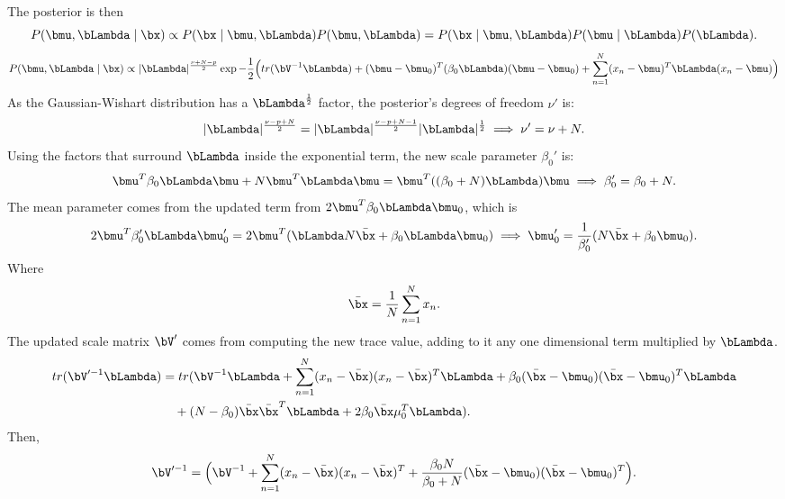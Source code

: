The posterior is then
\[
  P(\bmu, \bLambda \mid \bx) \propto P(\bx \mid \bmu, \bLambda)P(\bmu, \bLambda) = P(\bx \mid \bmu, \bLambda)P(\bmu \mid \bLambda) P(\bLambda).
\]
\[
  P(\bmu, \bLambda \mid \bx) \propto |\bLambda|^{\frac{\nu + N - p}{2}} \exp -\frac{1}{2}\Big( tr(\bV^{-1}\bLambda) + (\bmu - \bmu_{0})^{T} (\beta_{0}\bLambda)(\bmu - \bmu_{0}) + \sum_{n=1}^{N}(x_{n} - \bmu)^{T}\bLambda(x_{n}- \bmu)  \Big)
\]
As the Gaussian-Wishart distribution has a \(\bLambda^{\frac{1}{2}}\) factor, the posterior's degrees of freedom \(\nu'\) is:
\[
  |\bLambda|^{\frac{\nu - p + N}{2}} = |\bLambda|^{\frac{\nu - p + N-1}{2}} |\bLambda|^{\frac{1}{2}}  \implies \nu' = \nu + N.
\]
Using the factors that surround \(\bLambda\) inside the exponential term, the new scale parameter \(\beta_{0}'\) is:
\[
  \bmu^{T}\beta_{0}\bLambda\bmu + N\bmu^{T}\bLambda\bmu = \bmu^{T}((\beta_{0} + N)\bLambda)\bmu \implies \beta_{0}' = \beta_{0} + N.
\]
The mean parameter comes from the updated term from \(2\bmu^{T}\beta_{0}\bLambda\bmu_{0}\), which is
\[
  2\bmu^{T}\beta_{0}'\bLambda\bmu_{0}' = 2\bmu^{T}(\bLambda N \bar{\bx} + \beta_{0}\bLambda\bmu_{0}) \implies \bmu_{0}' = \frac{1}{\beta_{0}'}(N\bar{\bx} + \beta_{0}\bmu_{0}).
\]
Where
\[
  \bar{\bx} = \frac{1}{N}\sum_{n=1}^{N}x_{n}.
\]
The updated scale matrix \(\bV'\) comes from computing the new trace value, adding to it any one dimensional term multiplied by \(\bLambda\).
\[
  \begin{aligned}
    tr(\bV'^{-1} \bLambda) &= tr(\bV^{-1}\bLambda + \sum_{n=1}^{N}(x_{n} - \bar{\bx})(x_{n} - \bar{\bx})^{T}\bLambda + \beta_{0}(\bar{\bx} - \bmu_{0})(\bar{\bx} - \bmu_{0})^{T}\bLambda\\
    &\quad+ (N - \beta_{0})\bar{\bx}\bar{\bx}^{T}\bLambda + 2\beta_{0}\bar{\bx}\mu_{0}^{T}\bLambda).
  \end{aligned}
\]
Then,
\[
  \bV'^{-1} = \Big(\bV^{-1} + \sum_{n=1}^{N}(x_{n} - \bar{\bx})(x_{n} - \bar{\bx})^{T} + \frac{\beta_{0}N}{\beta_{0} + N}(\bar{\bx} - \bmu_{0})(\bar{\bx} - \bmu_{0})^{T}\Big).
\]
